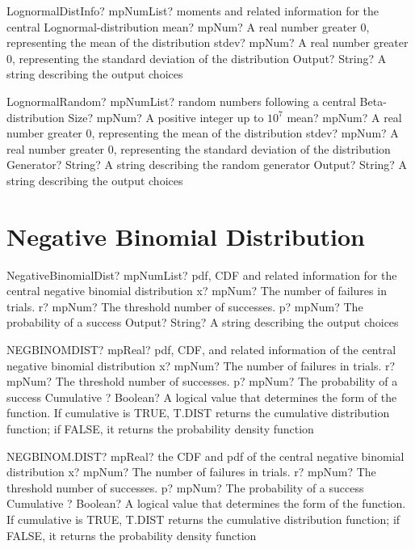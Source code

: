 \documentclass[12pt,a4paper,openany]{book}
\begin{document}
\begin{mpFunctionsExtract}
\mpFunctionThreeNotImplemented
{LognormalDistInfo? mpNumList? moments and related information for the central Lognormal-distribution}
{mean? mpNum? A real number greater 0, representing the mean of the distribution}
{stdev? mpNum? A real number greater 0, representing the standard deviation of the distribution}
{Output? String? A string describing the output choices}
\end{mpFunctionsExtract}

\begin{mpFunctionsExtract}
\mpFunctionFiveNotImplemented
{LognormalRandom? mpNumList? random numbers following a central Beta-distribution}
{Size? mpNum? A positive integer up to $10^7$}
{mean? mpNum? A real number greater 0, representing the mean of the distribution}
{stdev? mpNum? A real number greater 0, representing the standard deviation of the distribution}
{Generator? String? A string describing the random generator}
{Output? String? A string describing the output choices}
\end{mpFunctionsExtract}

\section{Negative Binomial Distribution}

\begin{mpFunctionsExtract}
\mpFunctionFourNotImplemented
{NegativeBinomialDist? mpNumList? pdf, CDF and related information for the central negative binomial distribution}
{x? mpNum? The number of failures in trials.}
{r? mpNum? The threshold number of successes.}
{p? mpNum? The probability of a success}
{Output? String? A string describing the output choices}
\end{mpFunctionsExtract}

\begin{mpFunctionsExtract}
\mpWorksheetFunctionFourNotImplemented
{NEGBINOMDIST? mpReal? pdf, CDF, and related information of the central negative binomial distribution}
{x? mpNum? The number of failures in trials.}
{r? mpNum? The threshold number of successes.}
{p? mpNum? The probability of a success}
{Cumulative ? Boolean? A logical value that determines the form of the function. If cumulative is TRUE, T.DIST returns the cumulative distribution function; if FALSE, it returns the probability density function}
\end{mpFunctionsExtract}

\begin{mpFunctionsExtract}
\mpWorksheetFunctionFourNotImplemented
{NEGBINOM.DIST? mpReal? the CDF and pdf of the central negative binomial distribution}
{x? mpNum? The number of failures in trials.}
{r? mpNum? The threshold number of successes.}
{p? mpNum? The probability of a success}
{Cumulative ? Boolean? A logical value that determines the form of the function. If cumulative is TRUE, T.DIST returns the cumulative distribution function; if FALSE, it returns the probability density function}
\end{mpFunctionsExtract}
\end{document}
